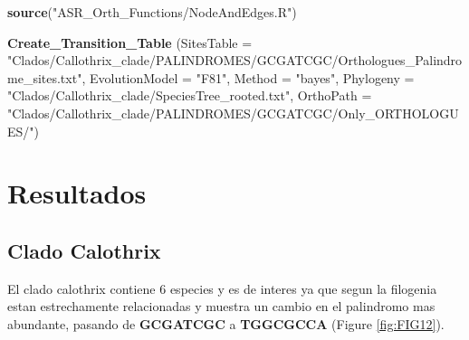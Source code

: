 \documentclass[
]{book}
\newenvironment{Shaded}{\begin{snugshade}}{\end{snugshade}}
\newcommand{\AttributeTok}[1]{\textcolor[rgb]{0.13,0.29,0.53}{#1}}
\newcommand{\FunctionTok}[1]{\textcolor[rgb]{0.13,0.29,0.53}{\textbf{#1}}}
\newcommand{\NormalTok}[1]{#1}
\newcommand{\StringTok}[1]{\textcolor[rgb]{0.31,0.60,0.02}{#1}}
\begin{document}
\begin{Shaded}
\begin{Highlighting}[]
\FunctionTok{source}\NormalTok{(}\StringTok{"ASR\_Orth\_Functions/NodeAndEdges.R"}\NormalTok{)}

\FunctionTok{Create\_Transition\_Table}\NormalTok{ (}\AttributeTok{SitesTable =} \StringTok{"Clados/Callothrix\_clade/PALINDROMES/GCGATCGC/Orthologues\_Palindrome\_sites.txt"}\NormalTok{,}
                                \AttributeTok{EvolutionModel =} \StringTok{"F81"}\NormalTok{,}
                                \AttributeTok{Method =} \StringTok{"bayes"}\NormalTok{,}
                                \AttributeTok{Phylogeny =} \StringTok{"Clados/Callothrix\_clade/SpeciesTree\_rooted.txt"}\NormalTok{,}
                                \AttributeTok{OrthoPath =} \StringTok{"Clados/Callothrix\_clade/PALINDROMES/GCGATCGC/Only\_ORTHOLOGUES/"}\NormalTok{)}
\end{Highlighting}
\end{Shaded}

\hypertarget{resultados}{%
\chapter{Resultados}\label{resultados}}

\hypertarget{clado-calothrix}{%
\section{Clado Calothrix}\label{clado-calothrix}}

El clado calothrix contiene 6 especies y es de interes ya que segun la filogenia estan estrechamente relacionadas y muestra un cambio en el palindromo mas abundante, pasando de \textbf{GCGATCGC} a \textbf{TGGCGCCA} (Figure \ref{fig:FIG12}).
\end{document}
